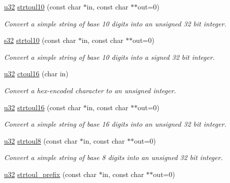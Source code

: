\begin{DoxyCompactItemize}
\item 
\hyperlink{namespaceirr_a0416a53257075833e7002efd0a18e804}{u32} \hyperlink{namespaceirr_1_1core_ae7f759b603f4caaa8471cb9bc2e23648}{strtoul10} (const char $\ast$in, const char $\ast$$\ast$out=0)
\begin{DoxyCompactList}\small\item\em Convert a simple string of base 10 digits into an unsigned 32 bit integer. \end{DoxyCompactList}\item 
\hyperlink{namespaceirr_ac66849b7a6ed16e30ebede579f9b47c6}{s32} \hyperlink{namespaceirr_1_1core_a6ff97e442233218d18acd56add48766f}{strtol10} (const char $\ast$in, const char $\ast$$\ast$out=0)
\begin{DoxyCompactList}\small\item\em Convert a simple string of base 10 digits into a signed 32 bit integer. \end{DoxyCompactList}\item 
\hyperlink{namespaceirr_a0416a53257075833e7002efd0a18e804}{u32} \hyperlink{namespaceirr_1_1core_a8b818c2189b834bffacd522ff752c3a6}{ctoul16} (char in)
\begin{DoxyCompactList}\small\item\em Convert a hex-\/encoded character to an unsigned integer. \end{DoxyCompactList}\item 
\hyperlink{namespaceirr_a0416a53257075833e7002efd0a18e804}{u32} \hyperlink{namespaceirr_1_1core_a96fa4fe7401b30c9057a0dbc7cd27c73}{strtoul16} (const char $\ast$in, const char $\ast$$\ast$out=0)
\begin{DoxyCompactList}\small\item\em Convert a simple string of base 16 digits into an unsigned 32 bit integer. \end{DoxyCompactList}\item 
\hyperlink{namespaceirr_a0416a53257075833e7002efd0a18e804}{u32} \hyperlink{namespaceirr_1_1core_a005590192e3f22d79759d98d42844b38}{strtoul8} (const char $\ast$in, const char $\ast$$\ast$out=0)
\begin{DoxyCompactList}\small\item\em Convert a simple string of base 8 digits into an unsigned 32 bit integer. \end{DoxyCompactList}\item 
\hyperlink{namespaceirr_a0416a53257075833e7002efd0a18e804}{u32} \hyperlink{namespaceirr_1_1core_ad67ad09c33fe26fa9a15aa10ded801b7}{strtoul\+\_\+prefix} (const char $\ast$in, const char $\ast$$\ast$out=0)
$$
\end{DoxyCompactItemize}
